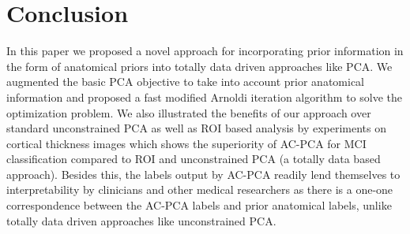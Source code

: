\documentclass{article}
\begin{document}
\section{Conclusion}
In this paper we proposed a novel approach for incorporating prior information in the form of anatomical priors into totally data driven approaches like PCA. We augmented the basic PCA objective to take into account prior anatomical information and proposed a fast modified Arnoldi iteration algorithm to solve the optimization problem. 
We also illustrated the benefits of our approach over standard unconstrained PCA as well as ROI based analysis by experiments on cortical thickness images which shows the superiority of AC-PCA for MCI classification compared to ROI and unconstrained PCA (a totally data based approach).  Besides this, the labels output by AC-PCA readily lend themselves
to interpretability by clinicians and other medical researchers as there is a one-one correspondence between the AC-PCA labels and prior anatomical labels, unlike totally data driven approaches like unconstrained PCA.
\fi



\end{document}
